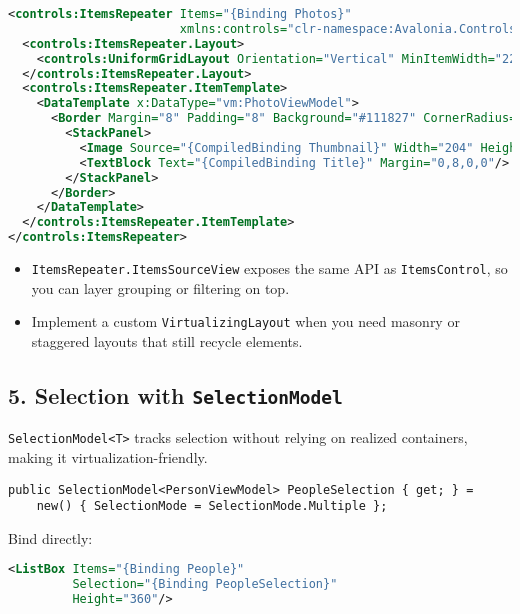 \begin{lstlisting}[language=XML]
<controls:ItemsRepeater Items="{Binding Photos}"
                        xmlns:controls="clr-namespace:Avalonia.Controls;assembly=Avalonia.Controls">
  <controls:ItemsRepeater.Layout>
    <controls:UniformGridLayout Orientation="Vertical" MinItemWidth="220" MinItemHeight="180"/>
  </controls:ItemsRepeater.Layout>
  <controls:ItemsRepeater.ItemTemplate>
    <DataTemplate x:DataType="vm:PhotoViewModel">
      <Border Margin="8" Padding="8" Background="#111827" CornerRadius="6">
        <StackPanel>
          <Image Source="{CompiledBinding Thumbnail}" Width="204" Height="128" Stretch="UniformToFill"/>
          <TextBlock Text="{CompiledBinding Title}" Margin="0,8,0,0"/>
        </StackPanel>
      </Border>
    </DataTemplate>
  </controls:ItemsRepeater.ItemTemplate>
</controls:ItemsRepeater>
\end{lstlisting}

\begin{itemize}
\tightlist
\item
  \passthrough{\lstinline!ItemsRepeater.ItemsSourceView!} exposes the
  same API as \passthrough{\lstinline!ItemsControl!}, so you can layer
  grouping or filtering on top.
\item
  Implement a custom \passthrough{\lstinline!VirtualizingLayout!} when
  you need masonry or staggered layouts that still recycle elements.
\end{itemize}

\subsection{\texorpdfstring{5. Selection with
\texttt{SelectionModel}}{5. Selection with SelectionModel}}\label{selection-with-selectionmodel}

\passthrough{\lstinline!SelectionModel<T>!} tracks selection without
relying on realized containers, making it virtualization-friendly.

\begin{lstlisting}
public SelectionModel<PersonViewModel> PeopleSelection { get; } =
    new() { SelectionMode = SelectionMode.Multiple };
\end{lstlisting}

Bind directly:

\begin{lstlisting}[language=XML]
<ListBox Items="{Binding People}"
         Selection="{Binding PeopleSelection}"
         Height="360"/>
\end{lstlisting}

